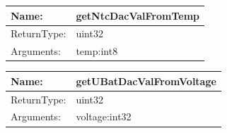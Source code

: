 \begin{tabular}[ht]{|l|l|}
\hline		
	Name: & getNtcDacValFromTemp\\
	\hline
	ReturnType: &  uint32\\
	\hline
	Arguments: & temp:int8\\
	\hline
\end{tabular}
\newline\newline\newline
\begin{tabular}[ht]{|l|l|}
\hline		
	Name: & getUBatDacValFromVoltage\\
	\hline
	ReturnType: &  uint32\\
	\hline
	Arguments: & voltage:int32\\
	\hline
\end{tabular}
\newline\newline\newline
